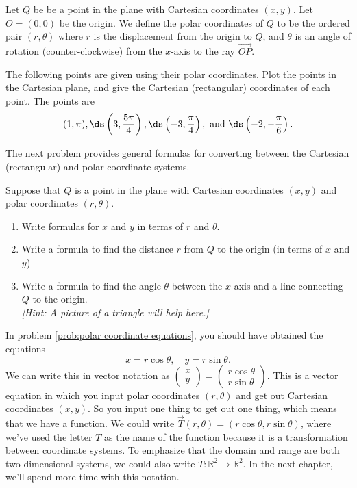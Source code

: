 \begin{definition}
Let $Q$ be be a point in the plane with Cartesian coordinates $(x,y)$.  Let $O=(0,0)$ be the origin. We define the polar coordinates of $Q$ to be the ordered pair $(r,\theta)$ where $r$ is the displacement from the origin to $Q$, and $\theta$ is an angle of rotation (counter-clockwise) from the $x$-axis to the ray $\vec {OP}$.
\end{definition}

\begin{problem}  
%
The following points are given using their polar coordinates.  Plot the points in the Cartesian plane, and give the Cartesian (rectangular) coordinates of each point. The points are
$$
(1,\pi), 
\ds \left( 3,\frac{5\pi}{4}\right),
\ds \left( -3,\frac{\pi}{4}\right),\text{ and }
\ds \left( -2,-\frac{\pi}{6}\right).$$
\end{problem}

The next problem provides general formulas for converting between the Cartesian (rectangular) and polar coordinate systems.

\begin{problem}\label{prob:polar coordinate equations}  
%
Suppose that $Q$ is a point in the plane with Cartesian coordinates $(x,y)$ and polar coordinates $(r,\theta)$.
\begin{enumerate}
	\item Write formulas for $x$ and $y$ in terms of $r$ and $\theta$.  
	\item Write a formula to find the distance $r$ from $Q$ to the origin (in terms of $x$ and $y$) 
	\item Write a formula to find the angle $\theta$ between the $x$-axis and a line connecting $Q$ to the origin. \\
	\textit{[Hint: A picture of a triangle will help here.]}
\end{enumerate}
\end{problem}
 
In problem \ref{prob:polar coordinate equations}, you should have obtained the equations 
$$x=r\cos\theta, \quad y=r\sin\theta.$$
We can write this in vector notation as $\begin{pmatrix}x\\y\end{pmatrix}=\begin{pmatrix}r\cos\theta\\ r\sin\theta\end{pmatrix}$.
This is a vector equation in which you input polar coordinates $(r,\theta)$ and get out Cartesian coordinates $(x,y)$.  
So you input one thing to get out one thing, which means that we have a function.  
We could write $\vec T(r,\theta) = (r\cos\theta,r\sin\theta)$, where we've used the letter $T$ as the name of the function because it is a transformation between coordinate systems. 
To emphasize that the domain and range are both two dimensional systems, we could also write $T:\mathbb{R}^2\to\mathbb{R}^2$. In the next chapter, we'll spend more time with this notation.\\


